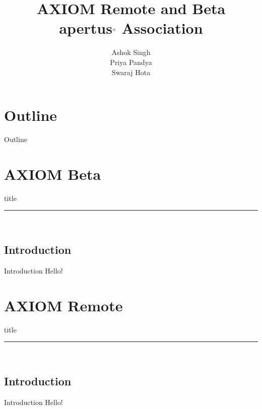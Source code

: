 \documentclass{beamer}
\title{AXIOM Remote and Beta \\  
apertus$\degree$ Association} %
\author{Ashok Singh \\
Priya Pandya \\
Swaraj Hota}
\date{}
\begin{document}
{ 
\frame{\titlepage}}

\section*{Outline}\begin{frame}{Outline}\tableofcontents\end{frame}

\section{AXIOM Beta}
    \begin{frame}[plain]
        \vfill
      \centering
      \begin{beamercolorbox}[sep=8pt,center,shadow=true,rounded=true]{title}
        \insertsectionhead\par%
        \color{apertus_orange}\noindent\rule{10cm}{1pt} \\
        \LARGE{\faFileTextO}
      \end{beamercolorbox}
      \vfill
  \end{frame}

\subsection{Introduction}
\begin{frame}{Introduction}
Hello!

\end{frame}

\section{AXIOM Remote}
    \begin{frame}[plain]
        \vfill
      \centering
      \begin{beamercolorbox}[sep=8pt,center,shadow=true,rounded=true]{title}
        \insertsectionhead\par%
        \color{apertus_orange}\noindent\rule{10cm}{1pt} \\
        \LARGE{\faFileTextO}
      \end{beamercolorbox}
      \vfill
  \end{frame}

\subsection{Introduction}
\begin{frame}{Introduction}
Hello!

\end{frame}
\end{document}
